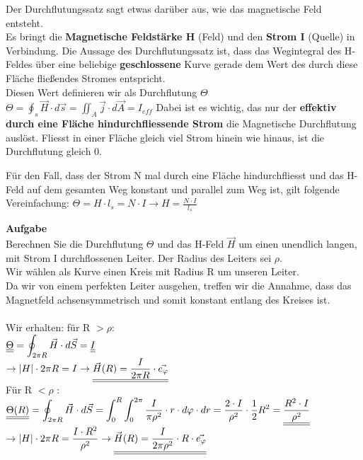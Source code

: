 	\begingl
	Der Durchflutungssatz sagt etwas darüber aus, wie das magnetische Feld entsteht. \\
	 Es bringt die \textbf{Magnetische Feldstärke H} (Feld) und den \textbf{Strom I} (Quelle) in Verbindung.
	Die Aussage des Durchflutungssatz ist, dass das Wegintegral des H-Feldes über eine beliebige \textbf{geschlossene} Kurve gerade dem Wert des durch diese Fläche fließendes Stromes entspricht. \\
	Diesen Wert definieren wir als Durchflutung $\Theta$ \\
	\formulaBegin
	$\displaystyle \Theta = \oint_{s} \vec{H} \cdot d\vec{s} = \iint_{A} \vec{j} \cdot d\vec{A} = I_{eff}$
	\formulaEnd
	Dabei ist es wichtig, das nur der \textbf{effektiv durch eine Fläche hindurchfliessende Strom} die Magnetische Durchflutung auslöst. Fliesst in einer Fläche gleich viel Strom hinein wie hinaus, ist die Durchflutung gleich 0.
	\iend

	\begingl
	Für den Fall, dass der Strom N mal durch eine Fläche hindurchfliesst und das H-Feld auf dem gesamten Weg konstant und parallel zum Weg ist, gilt folgende Vereinfachung:
	\formulaBegin
	$\displaystyle \Theta = H \cdot l_s = N\cdot I \rightarrow H = \frac{N \cdot I}{l_s}$
	\formulaEnd
	\iend

	\beginbsp
	\textbf{Aufgabe} \\
	Berechnen Sie die Durchflutung $\Theta$ und das H-Feld $\vec{H}$ um einen unendlich langen, mit Strom I durchflossenen Leiter. Der Radius des Leiters sei $\rho$. \\
	\iend
	\beginbsp
	Wir wählen als Kurve einen Kreis mit Radius R um unseren Leiter. \\
	Da wir von einem perfekten Leiter ausgehen, treffen wir die Annahme, dass das Magnetfeld achsensymmetrisch und somit konstant entlang des Kreises ist. \\
	\\
	Wir erhalten: für R $ > \rho$: \\
	$\displaystyle  \underline{\underline{\Theta}} =  \oint_{2\pi R} \vec{H} \cdot d\vec{S} = \underline{\underline{I}} $ \\
	$ \displaystyle \rightarrow |H| \cdot 2 \pi R = I \rightarrow \underline{\underline{\vec{H}(R) = \frac{I}{2 \pi R} \cdot \vec{e_{\varphi}}}} $\\

	Für R $ < \rho $ : \\
	$\displaystyle  \underline{\underline{\Theta(R)}} =  \oint_{2\pi R} \vec{H} \cdot d\vec{S} =\int_{0}^{R} \int_{0}^{2\pi} \frac{I}{\pi{\rho}^2} \cdot r \cdot d\varphi  \cdot dr  = \frac{2 \cdot I}{\rho^2} \cdot \frac{1}{2} R^2 =  \underline{\underline{\frac{R^2\cdot I}{\rho^2}}} 		  $ \\
	$ \displaystyle \rightarrow |H| \cdot 2 \pi R = \frac{I \cdot R^2}{\rho^2} \rightarrow \underline{\underline{\vec{H}(R) = \frac{I}{2\pi \rho^2} \cdot R \cdot \vec{e_{\varphi}}}} $

